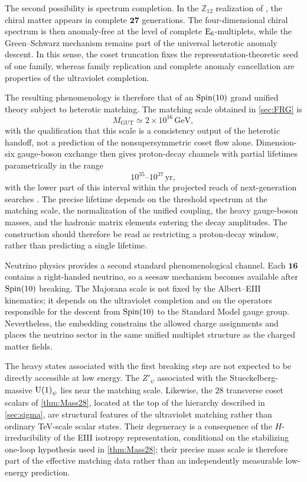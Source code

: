 \documentclass[pdflatex,sn-mathphys-num]{sn-jnl}
\theoremstyle{thmstyleone}
\theoremstyle{thmstylethree}%
\theoremstyle{thmstyletwo}%
\begin{document}
The second possibility is spectrum completion. In the \(\mathbb Z_{12}\)
realization of \cite{Z12Heterotic}, the chiral matter appears in complete
\(\mathbf{27}\) generations. The four-dimensional chiral spectrum is then
anomaly-free at the level of complete \(\mathrm{E}_{6}\)-multiplets, while the
Green--Schwarz mechanism remains part of the universal heterotic anomaly
descent. In this sense, the coset truncation fixes the representation-theoretic
seed of one family, whereas family replication and complete anomaly
cancellation are properties of the ultraviolet completion.

The resulting phenomenology is therefore that of an \(\operatorname{Spin}(10)\) grand unified
theory subject to heterotic matching. The matching scale obtained in
\autoref{sec:FRG} is
\[
  M_{\mathrm{GUT}}\simeq 2\times 10^{16}\,\mathrm{GeV},
\]
with the qualification that this scale is a consistency output of the
heterotic handoff, not a prediction of the nonsupersymmetric coset flow alone.
Dimension-six gauge-boson exchange then gives proton-decay channels with
partial lifetimes parametrically in the range
\[
  10^{35}\text{--}10^{37}\,\mathrm{yr},
\]
with the lower part of this interval within the projected reach of
next-generation searches \cite{NathFileviezPerez:2007}. The precise lifetime
depends on the threshold spectrum at the matching scale, the normalization of
the unified coupling, the heavy gauge-boson masses, and the hadronic matrix
elements entering the decay amplitudes. The construction should therefore be
read as restricting a proton-decay window, rather than predicting a single
lifetime.

Neutrino physics provides a second standard phenomenological channel. Each
\(\mathbf{16}\) contains a right-handed neutrino, so a seesaw mechanism becomes
available after \(\operatorname{Spin}(10)\) breaking. The Majorana scale is not fixed by the
Albert--EIII kinematics; it depends on the ultraviolet completion and on the
operators responsible for the descent from \(\operatorname{Spin}(10)\) to the Standard Model
gauge group. Nevertheless, the embedding constrains the allowed charge
assignments and places the neutrino sector in the same unified multiplet
structure as the charged matter fields.

The heavy states associated with the first breaking step are not expected to be
directly accessible at low energy. The \(Z'_{\psi}\) associated with the
Stueckelberg-massive \(\mathrm{U(1)}_\psi\) lies near the matching scale. Likewise, the
\(28\) transverse coset scalars of \autoref{thm:Mass28}, located at the top of
the hierarchy described in \autoref{sec:sigma}, are structural features of the
ultraviolet matching rather than ordinary TeV-scale scalar states. Their
degeneracy is a consequence of the \(H\)-irreducibility of the EIII isotropy
representation, conditional on the stabilizing one-loop hypothesis used in
\autoref{thm:Mass28}; their precise mass scale is therefore part of the
effective matching data rather than an independently measurable low-energy
prediction.
\end{document}
